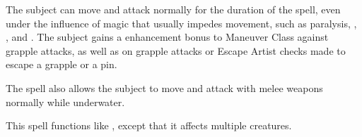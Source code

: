 \spelldur{\durshort}
\begin{spelleffect}
    The subject can move and attack normally for the duration of the spell, even under the influence of magic that usually impedes movement, such as paralysis, , , and . The subject gains a  enhancement bonus to Maneuver Class against grapple attacks, as well as on grapple attacks or Escape Artist checks made to escape a grapple or a pin.
    \par The spell also allows the subject to move and attack with melee weapons normally while underwater.
\end{spelleffect}

\begin{spelleffect}
    This spell functions like , except that it affects multiple creatures.
\end{spelleffect}

\begin{comment}
\subsubsection{G}
\end{comment}

